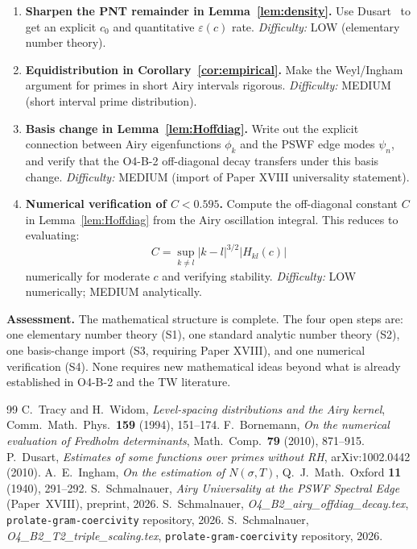\documentclass[12pt,a4paper]{amsart}
\theoremstyle{definition}
\begin{document}
\begin{enumerate}
\item[\textbf{S1}] \textbf{Sharpen the PNT remainder in Lemma~\ref{lem:density}.}
  Use Dusart~\cite{Dusart2010} to get an explicit $c_0$
  and quantitative $\varepsilon(c)$ rate.
  \emph{Difficulty:} LOW (elementary number theory).

\item[\textbf{S2}] \textbf{Equidistribution in Corollary~\ref{cor:empirical}.}
  Make the Weyl/Ingham argument for primes in short Airy intervals rigorous.
  \emph{Difficulty:} MEDIUM (short interval prime distribution).

\item[\textbf{S3}] \textbf{Basis change in Lemma~\ref{lem:Hoffdiag}.}
  Write out the explicit connection between Airy eigenfunctions $\phi_k$
  and the PSWF edge modes $\psi_n$, and verify that the
  O4-B-2 off-diagonal decay transfers under this basis change.
  \emph{Difficulty:} MEDIUM (import of Paper XVIII universality statement).

\item[\textbf{S4}] \textbf{Numerical verification of $C < 0.595$.}
  Compute the off-diagonal constant $C$ in Lemma~\ref{lem:Hoffdiag}
  from the Airy oscillation integral.
  This reduces to evaluating:
  \[
    C = \sup_{k \ne l} |k-l|^{3/2} |H_{kl}(c)|
  \]
  numerically for moderate $c$ and verifying stability.
  \emph{Difficulty:} LOW numerically; MEDIUM analytically.
\end{enumerate}

\textbf{Assessment.}
The mathematical structure is complete.
The four open steps are: one elementary number theory (S1),
one standard analytic number theory (S2),
one basis-change import (S3, requiring Paper XVIII),
and one numerical verification (S4).
None requires new mathematical ideas beyond what is already established
in O4-B-2 and the TW literature.

\begin{thebibliography}{99}
C.~Tracy and H.~Widom,
\textit{Level-spacing distributions and the Airy kernel},
Comm.\ Math.\ Phys.\ \textbf{159} (1994), 151--174.
F.~Bornemann,
\textit{On the numerical evaluation of Fredholm determinants},
Math.\ Comp.\ \textbf{79} (2010), 871--915.
P.~Dusart,
\textit{Estimates of some functions over primes without RH},
arXiv:1002.0442 (2010).
A.~E.~Ingham,
\textit{On the estimation of $N(\sigma, T)$},
Q.\ J.\ Math.\ Oxford \textbf{11} (1940), 291--292.
S.~Schmalnauer, \textit{Airy Universality at the PSWF Spectral Edge}
(Paper~XVIII), preprint, 2026.
S.~Schmalnauer, \textit{O4\_B2\_airy\_offdiag\_decay.tex},
\texttt{prolate-gram-coercivity} repository, 2026.
S.~Schmalnauer, \textit{O4\_B2\_T2\_triple\_scaling.tex},
\texttt{prolate-gram-coercivity} repository, 2026.
\end{thebibliography}
\end{document}
